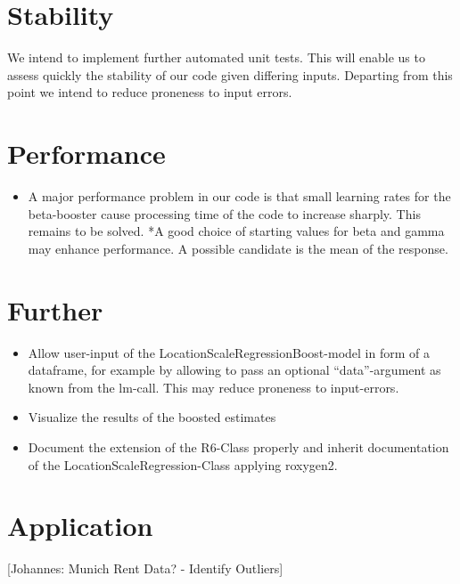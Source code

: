 \documentclass[
]{report}
\providecommand{\tightlist}{%
  \setlength{\itemsep}{0pt}\setlength{\parskip}{0pt}}
\begin{document}
\hypertarget{stability}{%
\section{Stability}\label{stability}}

We intend to implement further automated unit tests. This will enable us
to assess quickly the stability of our code given differing inputs.
Departing from this point we intend to reduce proneness to input errors.

\hypertarget{performance}{%
\section{Performance}\label{performance}}

\begin{itemize}
\tightlist
\item
  A major performance problem in our code is that small learning rates
  for the beta-booster cause processing time of the code to increase
  sharply. This remains to be solved. *A good choice of starting values
  for beta and gamma may enhance performance. A possible candidate is
  the mean of the response.
\end{itemize}

\hypertarget{further}{%
\section{Further}\label{further}}

\begin{itemize}
\item
  Allow user-input of the LocationScaleRegressionBoost-model in form of
  a dataframe, for example by allowing to pass an optional
  ``data''-argument as known from the lm-call. This may reduce proneness
  to input-errors.
\item
  Visualize the results of the boosted estimates
\item
  Document the extension of the R6-Class properly and inherit
  documentation of the LocationScaleRegression-Class applying roxygen2.
\end{itemize}

\hypertarget{application}{%
\section{Application}\label{application}}

{[}Johannes: Munich Rent Data? - Identify Outliers{]}
\end{document}
